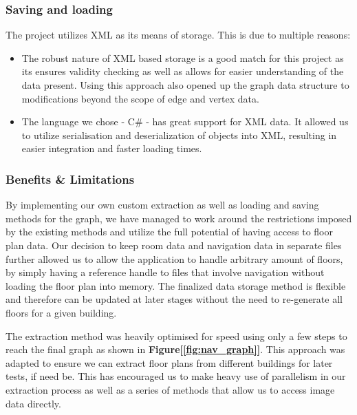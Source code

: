\documentclass[main.tex]{subfiles}
\begin{document}
\subsubsection{Saving and loading}
The project utilizes XML as its means of storage. This is due to multiple reasons:
	
\begin{itemize}

\item The robust nature of XML based storage is a good match for this project as its ensures validity checking as well as allows for easier understanding of the data present. Using this approach also opened up the graph data structure to modifications beyond the scope of edge and vertex data. 
		
\item The language we chose - C\# - has great support for XML data. It allowed us to utilize serialisation and deserialization of objects into XML, resulting in easier integration and faster loading times.
\end{itemize}

\subsubsection{Benefits \& Limitations}
By implementing our own custom extraction as well as loading and saving methods for the graph, we have managed to work around the restrictions imposed by the existing methods and utilize the full potential of having access to floor plan data. Our decision to keep room data and navigation data in separate files further allowed us to allow the application to handle arbitrary amount of floors, by simply having a reference handle to files that involve navigation without loading the floor plan into memory. The finalized data storage method is flexible and therefore can be updated at later stages without the need to re-generate all floors for a given building.
\newline

The extraction method was heavily optimised for speed using only a few steps to reach the final graph as shown in \textbf{Figure[\ref{fig:nav_graph}]}. This approach was adapted to ensure we can extract floor plans from different buildings for later tests, if need be. This has encouraged us to make heavy use of parallelism in our extraction process as well as a series of methods that allow us to access image data directly. 
\newline
\end{document}
